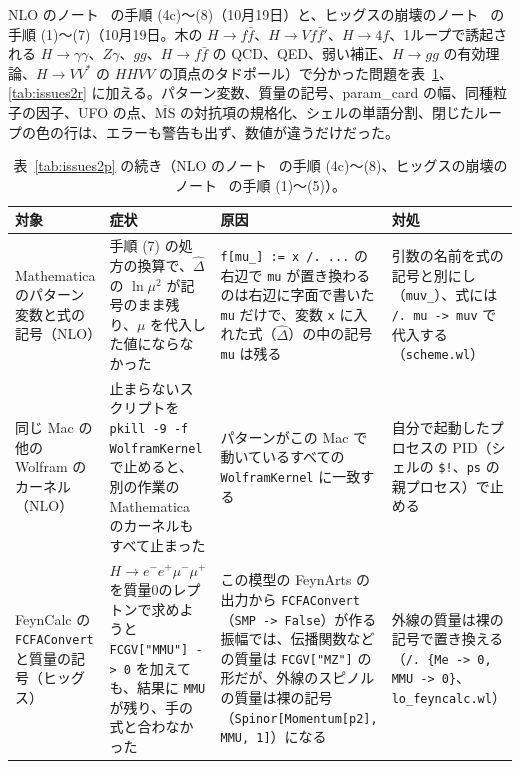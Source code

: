 \documentclass[a4paper,10pt]{ltjsarticle}
\begin{document}
NLO のノート~\cite{smnlonote} の手順 (4c)〜(8)（10月19日）と、ヒッグスの崩壊のノート~\cite{higgsnote} の手順 (1)〜(7)（10月19日。木の $H\to f\bar f$、$H\to Vf\bar f'$、$H\to4f$、1ループで誘起される $H\to\gamma\gamma$、$Z\gamma$、$gg$、$H\to f\bar f$ の QCD、QED、弱い補正、$H\to gg$ の有効理論、$H\to VV^*$ の $HHVV$ の頂点のタドポール）で分かった問題を表~\ref{tab:issues2q}、\ref{tab:issues2r} に加える。パターン変数、質量の記号、param\_card の幅、同種粒子の因子、UFO の点、$\overline{\mathrm{MS}}$ の対抗項の規格化、シェルの単語分割、閉じたループの色の行は、エラーも警告も出ず、数値が違うだけだった。

\begin{table}[tbp]
\centering\footnotesize
\caption{表~\ref{tab:issues2p} の続き（NLO のノート~\cite{smnlonote} の手順 (4c)〜(8)、ヒッグスの崩壊のノート~\cite{higgsnote} の手順 (1)〜(5)）。}
\label{tab:issues2q}
\begin{tabularx}{\linewidth}{>{\raggedright\arraybackslash}p{2.4cm}>{\raggedright\arraybackslash}X>{\raggedright\arraybackslash}X>{\raggedright\arraybackslash}X}
\toprule
\textbf{対象} & \textbf{症状} & \textbf{原因} & \textbf{対処} \\
\midrule
Mathematica のパターン変数と式の記号（NLO） & 手順 (7) の処方の換算で、$\hat\Delta$ の $\ln\mu^2$ が記号のまま残り、$\mu$ を代入した値にならなかった & \texttt{f[mu\_] := x /. ...} の右辺で \texttt{mu} が置き換わるのは右辺に字面で書いた \texttt{mu} だけで、変数 \texttt{x} に入れた式（$\hat\Delta$）の中の記号 \texttt{mu} は残る & 引数の名前を式の記号と別にし（\texttt{muv\_}）、式には \texttt{/. mu -> muv} で代入する（\texttt{scheme.wl}） \\
同じ Mac の他の Wolfram のカーネル（NLO） & 止まらないスクリプトを \texttt{pkill -9 -f WolframKernel} で止めると、別の作業の Mathematica のカーネルもすべて止まった & パターンがこの Mac で動いているすべての \texttt{WolframKernel} に一致する & 自分で起動したプロセスの PID（シェルの \texttt{\$!}、\texttt{ps} の親プロセス）で止める \\
FeynCalc の \texttt{FCFAConvert} と質量の記号（ヒッグス） & $H\to e^-e^+\mu^-\mu^+$ を質量0のレプトンで求めようと \texttt{FCGV["MMU"] -> 0} を加えても、結果に \texttt{MMU} が残り、手の式と合わなかった & この模型の FeynArts の出力から \texttt{FCFAConvert}（\texttt{SMP -> False}）が作る振幅では、伝播関数などの質量は \texttt{FCGV["MZ"]} の形だが、外線のスピノルの質量は裸の記号（\texttt{Spinor[Momentum[p2], MMU, 1]}）になる & 外線の質量は裸の記号で置き換える（\texttt{/. \{Me -> 0, MMU -> 0\}}、\texttt{lo\_feyncalc.wl}） \\

\end{tabularx}
\end{table}
\end{document}
